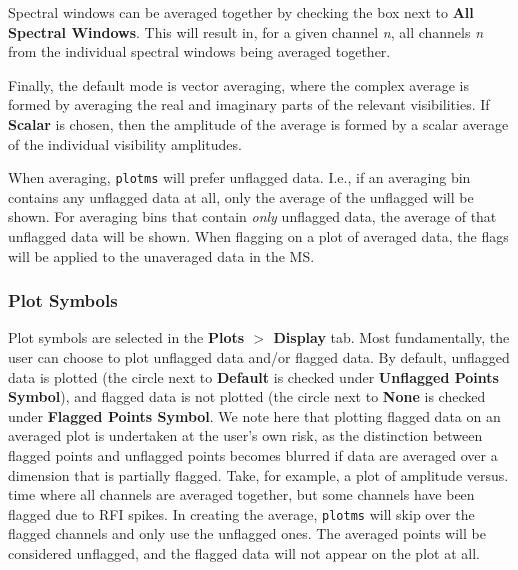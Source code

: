 Spectral windows can be averaged together by checking the box next to
{\bf All Spectral Windows}. This will result in, for a given channel
{\it n}, all channels {\it n} from the individual spectral windows
being averaged together.

Finally, the default mode is vector averaging, where the complex
average is formed by averaging the real and imaginary parts of the
relevant visibilities.  If {\bf Scalar} is chosen, then the amplitude
of the average is formed by a scalar average of the individual
visibility amplitudes.

When averaging, {\tt plotms} will prefer unflagged data.  I.e., if an
averaging bin contains any unflagged data at all, only the average of
the unflagged will be shown.  For averaging bins that contain {\em
  only} unflagged data, the average of that unflagged data will be
shown.  When flagging on a plot of averaged data, the flags will be
applied to the unaveraged data in the MS.


\subsubsection{Plot Symbols}
\label{section:edit.plot.plotms.symbol}

Plot symbols are selected in the {\bf Plots $>$ Display} tab. Most
fundamentally, the user can choose to plot unflagged data and/or
flagged data. By default, unflagged data is plotted (the circle next
to {\bf Default} is checked under {\bf Unflagged Points Symbol}), and
flagged data is not plotted (the circle next to {\bf None} is checked
under {\bf Flagged Points Symbol}. We note here that plotting flagged
data on an averaged plot is undertaken at the user's own risk, as the
distinction between flagged points and unflagged points becomes
blurred if data are averaged over a dimension that is partially
flagged. Take, for example, a plot of amplitude versus. time where all
channels are averaged together, but some channels have been flagged
due to RFI spikes. In creating the average, {\tt plotms} will skip
over the flagged channels and only use the unflagged ones. The
averaged points will be considered unflagged, and the flagged data
will not appear on the plot at all.

